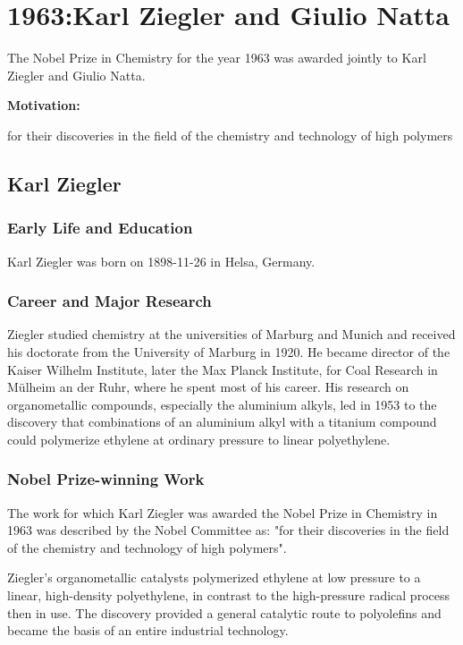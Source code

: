 \chapter{1963:Karl Ziegler and Giulio Natta}

\label{chap:chemistry1963}

The Nobel Prize in Chemistry for the year 1963 was awarded jointly to Karl Ziegler and Giulio Natta.

\textbf{Motivation:}

for their discoveries in the field of the chemistry and technology of high polymers

\section{Karl Ziegler}

\subsection*{Early Life and Education}

Karl Ziegler was born on 1898-11-26 in Helsa, Germany.

\subsection*{Career and Major Research}

Ziegler studied chemistry at the universities of Marburg and Munich and received his doctorate from the University of Marburg in 1920. He became director of the Kaiser Wilhelm Institute, later the Max Planck Institute, for Coal Research in M{\"u}lheim an der Ruhr, where he spent most of his career. His research on organometallic compounds, especially the aluminium alkyls, led in 1953 to the discovery that combinations of an aluminium alkyl with a titanium compound could polymerize ethylene at ordinary pressure to linear polyethylene.

\subsection*{Nobel Prize-winning Work}

The work for which Karl Ziegler was awarded the Nobel Prize in Chemistry in 1963 was described by the Nobel Committee as: "for their discoveries in the field of the chemistry and technology of high polymers".

Ziegler's organometallic catalysts polymerized ethylene at low pressure to a linear, high-density polyethylene, in contrast to the high-pressure radical process then in use. The discovery provided a general catalytic route to polyolefins and became the basis of an entire industrial technology.


